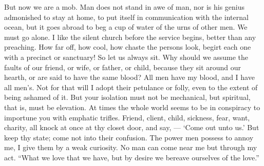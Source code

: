 \documentclass[12pt]{article}
\begin{document}
But now we are a mob. Man does not stand in awe of man, nor is his genius
admonished to stay at home, to put itself in communication with the internal
ocean, but it goes abroad to beg a cup of water of the urns of other men. We
must go alone. I like the silent church before the service begins, better
than any preaching. How far off, how cool, how chaste the persons look,
begirt each one with a precinct or sanctuary! So let us always sit. Why
should we assume the faults of our friend, or wife, or father, or child,
because they sit around our hearth, or are said to have the same blood? All
men have my blood, and I have all men's. Not for that will I adopt their
petulance or folly, even to the extent of being ashamed of it. But your
isolation must not be mechanical, but spiritual, that is, must be elevation.
At times the whole world seems to be in conspiracy to importune you with
emphatic trifles. Friend, client, child, sickness, fear, want, charity, all
knock at once at thy closet door, and say, --- `Come out unto us.' But keep
thy state; come not into their confusion. The power men possess to annoy me,
I give them by a weak curiosity. No man can come near me but through my act.
``What we love that we have, but by desire we bereave ourselves of the love.''
\end{document}
